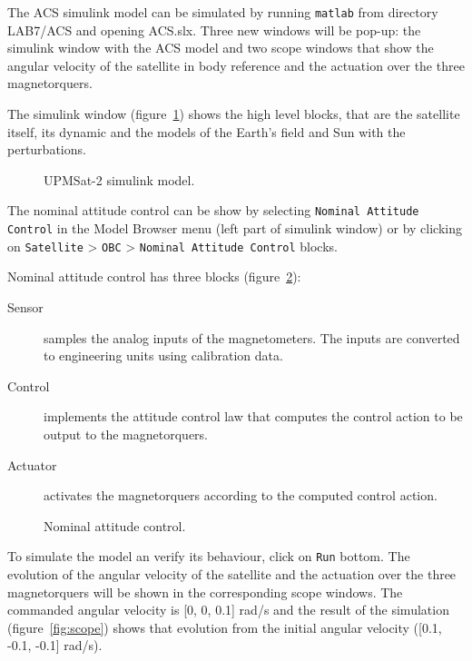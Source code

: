 The ACS simulink model can be simulated by running {\tt matlab} from directory LAB7/ACS and opening ACS.slx. Three new windows will be pop-up: the simulink window with the ACS model and two scope windows that show the angular velocity of the satellite in body reference and the actuation over the three magnetorquers.

The simulink window (figure~\ref{fig:acs-simulink}) shows the high level blocks, that are the satellite itself, its dynamic and the models of the Earth's field and Sun with the perturbations.

\begin{figure}[h]
            \caption{UPMSat-2 simulink model.}
            \label{fig:acs-simulink}
\end{figure}

The nominal attitude control can be show by selecting {\tt Nominal Attitude Control} in the Model Browser menu (left part of simulink window) or by clicking on {\tt Satellite} > {\tt OBC} > {\tt Nominal Attitude Control} blocks.

Nominal attitude control has three blocks (figure~\ref{fig:nac}):
\begin{description}
\item[Sensor] samples the analog inputs of the magnetometers. The inputs are converted to engineering units using calibration data.
\item[Control] implements the attitude control law that computes the control action to be output to the magnetorquers.
\item[Actuator] activates the magnetorquers according to the computed control action.
\end{description}

\begin{figure}[H]
            \caption{Nominal attitude control.}
            \label{fig:nac}
\end{figure}

To simulate the model an verify its behaviour, click on {\tt Run} bottom. The evolution of the angular velocity of the satellite and the actuation over the three magnetorquers will be shown in the corresponding scope windows. The commanded angular velocity is [0, 0, 0.1] rad/s and the result of the simulation (figure~\ref{fig:scope}) shows that evolution from the initial angular velocity ([0.1, -0.1, -0.1] rad/s).

